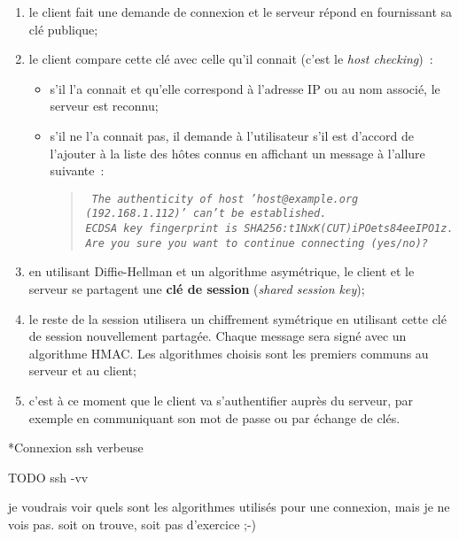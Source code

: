 \documentclass[a4paper,11pt]{article}
\begin{document}
\begin{enumerate}
	
	\item le client fait une demande de connexion et le serveur répond en
		fournissant sa clé publique;
	\item le client compare cette clé avec celle qu'il connait (c'est le
		\textit{host checking})~:
		\begin{itemize}			
			\item s'il l'a connait et qu'elle correspond à l'adresse IP ou au
				nom associé, le serveur est reconnu;
			\item s'il ne l'a connait pas, il demande à l'utilisateur s'il est
				d'accord de l'ajouter à la liste des hôtes connus en affichant
				un message à l'allure suivante~:

				\begin{quote}
					\it\tt \small
					The authenticity of host 'host@example.org (192.168.1.112)' 
					can't be established.\\
					ECDSA key fingerprint is SHA256:t1NxK(CUT)iPOets84eeIPO1z.\\
					Are you sure you want to continue connecting (yes/no)? 
				\end{quote}
		\end{itemize}

	\item en utilisant Diffie-Hellman et un algorithme asymétrique, le client et
		le serveur se partagent une \textbf{clé de session} (\textit{shared
		session key});

	\item le reste de la session utilisera un chiffrement symétrique en
		utilisant cette clé de session nouvellement partagée. Chaque message
		sera signé avec un algorithme HMAC.  Les algorithmes choisis sont les
		premiers communs au serveur et au client;

	\item c'est à ce moment que le client va s'authentifier auprès du serveur,
		par exemple en communiquant son mot de passe ou par échange de clés. 

\end{enumerate}

\begin{Exercice}*{Connexion ssh verbeuse}
	
	TODO ssh -vv 

	je voudrais voir quels sont les algorithmes utilisés pour une connexion, mais 
	je ne vois pas. soit on trouve, soit pas d'exercice ;-) 

\end{Exercice}
\end{document}
